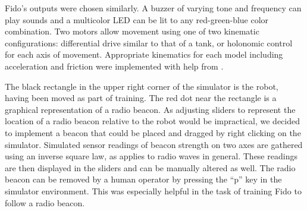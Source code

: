 Fido's outputs were chosen similarly.  A buzzer of varying tone and frequency can play sounds and a multicolor LED can be lit to any red-green-blue color combination. Two motors allow movement using one of two kinematic configurations: differential drive similar to that of a tank, or holonomic control for each axis of movement.  Appropriate kinematics for each model including acceleration and friction were implemented with help from \cite{dudek}.

The black rectangle in the upper right corner of the simulator is the robot, having been moved as part of training.  The red dot near the rectangle is a graphical representation of a radio beacon.  As adjusting sliders to represent the location of a radio beacon relative to the robot would be impractical, we decided to implement a beacon that could be placed and dragged by right clicking on the simulator.  Simulated sensor readings of beacon strength on two axes are gathered using an inverse square law, as applies to radio waves in general.  These readings are then displayed in the sliders and can be manually altered as well.  The radio beacon can be removed by a human operator by pressing the ``p'' key in the simulator environment.  This was especially helpful in the task of training Fido to follow a radio beacon.
